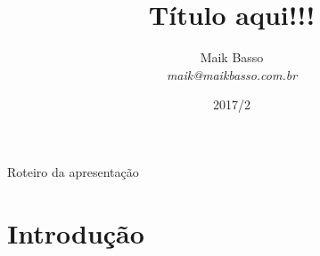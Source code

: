 \documentclass[handout]{beamer}
\title[Seminário de Andamento]{Título aqui!!!}
\author[Maik Basso]{Maik Basso\\ \textit{maik@maikbasso.com.br} }
\institute[UFRGS]{Orientador: Edison Pignaton de Freitas}
\date{2017/2}
\begin{document}
\begin{frame}[plain] %
	\titlepage
\end{frame}

\begin{frame}{Roteiro da apresentação}
	\tableofcontents
\end{frame}

\section{Introdução}



\end{document}
